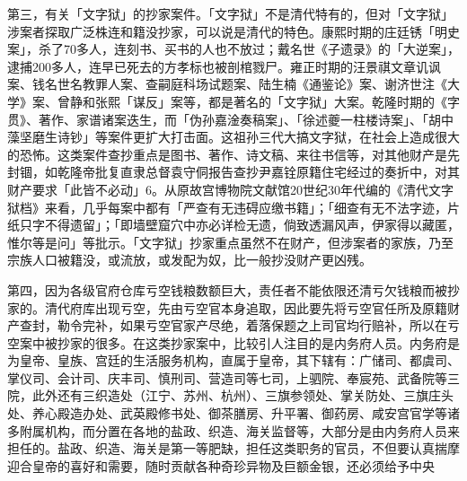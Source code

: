 \vfill
\begin{BookNotes}
\end{BookNotes}

第三，有关「文字狱」的抄家案件。「文字狱」不是清代特有的，但对「文字狱」涉案者探取广泛株连和籍没抄家，可以说是清代的特色。康熙时期的庄廷锈「明史案」，杀了70多人，连刻书、买书的人也不放过；戴名世《子遗录》的「大逆案」，逮捕200多人，连早已死去的方孝标也被剖棺戮尸。雍正时期的汪景祺文章讥讽案、钱名世名教罪人案、查嗣庭科场试题案、陆生楠《通鉴论》案、谢济世注《大学》案、曾静和张熙「谋反」案等，都是著名的「文字狱」大案。乾隆时期的《字贯》、著作、家谱诸案迭生，而「伪孙嘉淦奏稿案」、「徐述夔一柱楼诗案」、「胡中藻坚磨生诗钞」等案件更扩大打击面。这祖孙三代大搞文字狱，在社会上造成很大的恐怖。这类案件查抄重点是图书、著作、诗文稿、来往书信等，对其他财产是先封锢，如乾隆帝批复直隶总督袁守侗报告查抄尹嘉铨原籍住宅经过的奏折中，对其财产要求「此皆不必动」6。从原故宫博物院文献馆20世纪30年代编的《清代文字狱档》来看，几乎每案中都有「严查有无违碍应缴书籍」；「细查有无不法字迹，片纸只字不得遗留」；「即墙壁窟穴中亦必详检无遗，倘致透漏风声，伊家得以藏匿，惟尔等是问」等批示。「文字狱」抄家重点虽然不在财产，但涉案者的家族，乃至宗族人口被籍没，或流放，或发配为奴，比一般抄没财产更凶残。

第四，因为各级官府仓库亏空钱粮数额巨大，责任者不能依限还清亏欠钱粮而被抄家的。清代府库出现亏空，先由亏空官本身追取，因此要先将亏空官任所及原籍财产查封，勒令完补，如果亏空官家产尽绝，着落保题之上司官均行赔补，所以在亏空案中被抄家的很多。在这类抄家案中，比较引人注目的是内务府人员。内务府是为皇帝、皇族、宫廷的生活服务机构，直属于皇帝，其下辖有：广储司、都虞司、掌仪司、会计司、庆丰司、慎刑司、营造司等七司，上驷院、奉宸苑、武备院等三院，此外还有三织造处（江宁、苏州、杭州）、三旗参领处、掌关防处、三旗庄头处、养心殿造办处、武英殿修书处、御茶膳房、升平署、御药房、咸安宫官学等诸多附属机构，而分置在各地的盐政、织造、海关监督等，大部分是由内务府人员来担任的。盐政、织造、海关是第一等肥缺，担任这类职务的官员，不但要认真揣摩迎合皇帝的喜好和需要，随时贡献各种奇珍异物及巨额金银，还必须给予中央

\vfill
\begin{BookNotes}
\end{BookNotes}

